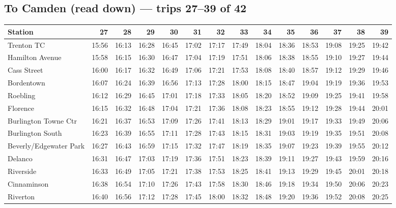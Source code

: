 \subsection*{To Camden (read down) --- trips 27--39 of 42}
\begin{center}\footnotesize\setlength{\tabcolsep}{3pt}\begin{tabular}{@{}lrrrrrrrrrrrrr@{}}\toprule
Station & 27 & 28 & 29 & 30 & 31 & 32 & 33 & 34 & 35 & 36 & 37 & 38 & 39 \\\midrule
Trenton TC & 15:56 & 16:13 & 16:28 & 16:45 & 17:02 & 17:17 & 17:49 & 18:04 & 18:36 & 18:53 & 19:08 & 19:25 & 19:42 \\
Hamilton Avenue & 15:58 & 16:15 & 16:30 & 16:47 & 17:04 & 17:19 & 17:51 & 18:06 & 18:38 & 18:55 & 19:10 & 19:27 & 19:44 \\
Cass Street & 16:00 & 16:17 & 16:32 & 16:49 & 17:06 & 17:21 & 17:53 & 18:08 & 18:40 & 18:57 & 19:12 & 19:29 & 19:46 \\
Bordentown & 16:07 & 16:24 & 16:39 & 16:56 & 17:13 & 17:28 & 18:00 & 18:15 & 18:47 & 19:04 & 19:19 & 19:36 & 19:53 \\
Roebling & 16:12 & 16:29 & 16:45 & 17:01 & 17:18 & 17:33 & 18:05 & 18:20 & 18:52 & 19:09 & 19:25 & 19:41 & 19:58 \\
Florence & 16:15 & 16:32 & 16:48 & 17:04 & 17:21 & 17:36 & 18:08 & 18:23 & 18:55 & 19:12 & 19:28 & 19:44 & 20:01 \\
Burlington Towne Ctr & 16:21 & 16:37 & 16:53 & 17:09 & 17:26 & 17:41 & 18:13 & 18:29 & 19:01 & 19:17 & 19:33 & 19:49 & 20:06 \\
Burlington South & 16:23 & 16:39 & 16:55 & 17:11 & 17:28 & 17:43 & 18:15 & 18:31 & 19:03 & 19:19 & 19:35 & 19:51 & 20:08 \\
Beverly/Edgewater Park & 16:27 & 16:43 & 16:59 & 17:15 & 17:32 & 17:47 & 18:19 & 18:35 & 19:07 & 19:23 & 19:39 & 19:55 & 20:12 \\
Delanco & 16:31 & 16:47 & 17:03 & 17:19 & 17:36 & 17:51 & 18:23 & 18:39 & 19:11 & 19:27 & 19:43 & 19:59 & 20:16 \\
Riverside & 16:33 & 16:49 & 17:05 & 17:21 & 17:38 & 17:53 & 18:25 & 18:41 & 19:13 & 19:29 & 19:45 & 20:01 & 20:18 \\
Cinnaminson & 16:38 & 16:54 & 17:10 & 17:26 & 17:43 & 17:58 & 18:30 & 18:46 & 19:18 & 19:34 & 19:50 & 20:06 & 20:23 \\
Riverton & 16:40 & 16:56 & 17:12 & 17:28 & 17:45 & 18:00 & 18:32 & 18:48 & 19:20 & 19:36 & 19:52 & 20:08 & 20:25 \\

\end{tabular}
\end{center}
